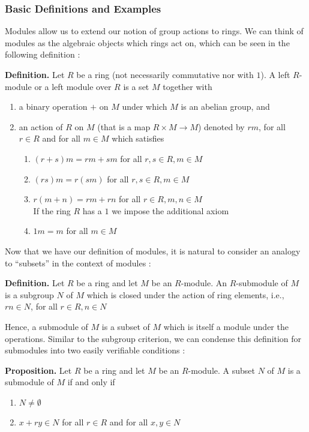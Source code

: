 \documentclass[11pt, reqno]{amsart}
\theoremstyle{plain}
\theoremstyle{definition}
\theoremstyle{example}
\begin{document}
\subsubsection{Basic Definitions and Examples}

Modules allow us to extend our notion of group actions to rings. We can think of modules as the algebraic objects which rings act on, which can be seen in the following definition \cite[\S 10.1, p. 337]{dummit}:

\par
\textbf{Definition.} Let $R$ be a ring (not necessarily commutative nor with $1$). A left $R$-module or a left module over $R$ is a set $M$ together with
\begin{enumerate}
\item a binary operation $+$ on $M$ under which $M$ is an abelian group, and
\item an action of $R$ on $M$ (that is a map $R \times M \to M$) denoted by $rm$, for all $r \in R$ and for all $m \in M$ which satisfies
\begin{enumerate}[label=\alph*)]
\item $(r+s)m = rm + sm$ for all $r, s \in R, m \in M$
\item $(rs)m = r(sm)$ for all $r,s \in R, m \in M$
\item $r(m + n) = rm + rn$ for all $r \in R, m, n \in M$\\

If the ring $R$ has a $1$ we impose the additional axiom
\item $1m = m$ for all $m \in M$
\end{enumerate}
\end{enumerate}

Now that we have our definition of modules, it is natural to consider an analogy to ``subsets'' in the context of modules \cite[\S 10.1, p. 337]{dummit}:

\par
\textbf{Definition.} Let $R$ be a ring and let $M$ be an $R$-module. An $R$-submodule of $M$ is a subgroup $N$ of $M$ which is closed under the action of ring elements, i.e., $rn \in N$, for all $r \in R, n \in N$

Hence, a submodule of $M$ is a subset of $M$ which is itself a module under the operations. Similar to the subgroup criterion, we can condense this definition for submodules into two easily verifiable conditions \cite[\S 10.1, p. 342]{dummit}:

\par
\textbf{Proposition.} Let $R$ be a ring and let $M$ be an $R$-module. A subset $N$ of $M$ is a submodule of $M$ if and only if
\begin{enumerate}
\item $N \neq \emptyset$
\item $x + ry \in N$ for all $r \in R$ and for all $x, y \in N$
\end{enumerate}
\end{document}

